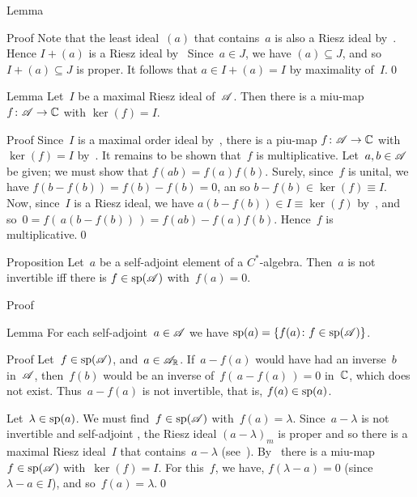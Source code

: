 \documentclass[main]{subfiles}
\begin{document}
\begin{parsec}
\begin{point}{Lemma}
\begin{point}{Proof}
Note that the least ideal~$(a)$ that contains~$a$
is also a Riesz ideal by~.
Hence  $I+(a)$ is a Riesz ideal by~
Since~$a\in J$, we have $(a)\subseteq J$,
and so~$I+(a)\subseteq J$ is proper.
It follows that $a\in I+(a)=I$ by maximality of~$I$.\qed
\end{point}
\end{point}
\begin{point}{Lemma}%
Let~$I$ be a maximal Riesz ideal of~$\mathscr{A}$.
Then there is a miu-map $f\colon \mathscr{A}\to \mathbb{C}$
with $\ker(f)=I$.
\begin{point}{Proof}%
Since~$I$ is a maximal order ideal 
by~,
there is a piu-map $f\colon \mathscr{A}\to \mathbb{C}$
with~$\ker(f)=I$ by~.
It remains to be shown that~$f$ is multiplicative.
Let~$a,b\in \mathscr{A}$ be given;
we must show that $f(ab)=f(a)f(b)$.
Surely, since~$f$ is unital,
we have $f(b-f(b))=f(b)-f(b)=0$,
an so $b-f(b)\in \ker(f)\equiv I$.
Now, since~$I$ is a Riesz ideal,
we have $a(b-f(b))\in I\equiv \ker(f)$ by~,
and so~$0=f(\,a(b-f(b))\,)=f(ab)-f(a)f(b)$.
Hence~$f$ is multiplicative.\qed
\end{point}
\end{point}
\begin{point}{Proposition}%
Let~$a$ be a self-adjoint element of a $C^*$-algebra.
Then~$a$ is not invertible
iff there is $f\in\mathrm{sp}(\mathscr{A})$ 
with~$f(a)=0$.
\begin{point}{Proof}%
\end{point}
\end{point}
\begin{point}{Lemma}%
For each self-adjoint~$a\in\mathscr{A}$ 
we have $\mathrm{sp}(a)=\{f(a)\colon f\in\mathrm{sp}(\mathscr{A})\}$.
\begin{point}{Proof}%
Let~$f\in \mathrm{sp}(\mathscr{A})$,
and~$a\in\mathscr{A}_{\mathbb{R}}$.
If~$a-f(a)$ would have had an inverse~$b$ in~$\mathscr{A}$,
then~$f(b)$ would be an inverse
of~$f(\,a-f(a)\,)=0$ in~$\mathbb{C}$,
which does not exist. Thus~$a-f(a)$ is not invertible,
that is, $f(a)\in \mathrm{sp}(a)$.

Let~$\lambda\in\mathrm{sp}(a)$.
We must find~$f\in \mathrm{sp}(\mathscr{A})$ with~$f(a)=\lambda$.
Since~$a-\lambda$ is not invertible
and self-adjoint	,
the Riesz ideal $(a-\lambda)_m$ is proper
and so there is a maximal Riesz ideal~$I$ that contains~$a-\lambda$
(see~).
By~
there is a miu-map $f\in \mathrm{sp}(\mathscr{A})$ with~$\ker(f)=I$.
For this~$f$,
we have, $f(\lambda-a)=0$
(since $\lambda-a\in I$),
and so~$f(a)=\lambda$.\qed


\end{point}
\end{point}
\end{parsec}
\end{document}
